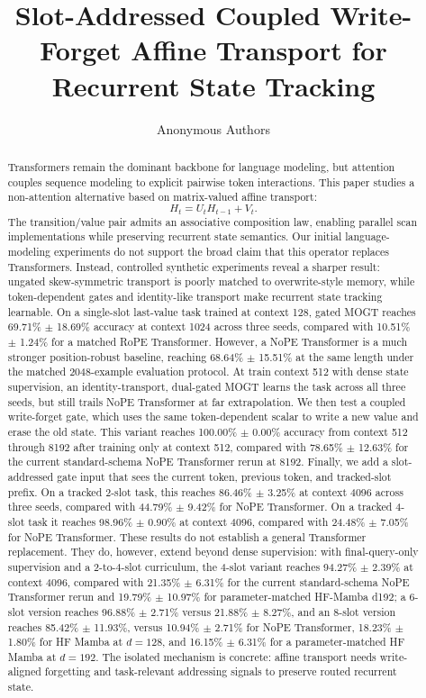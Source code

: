 \documentclass[10pt]{article}
\title{Slot-Addressed Coupled Write-Forget Affine Transport for Recurrent State Tracking}
\author{Anonymous Authors}
\date{}
\newcommand{\mogt}{MOGT}
\begin{document}
\maketitle

\begin{abstract}
Transformers remain the dominant backbone for language modeling, but attention
couples sequence modeling to explicit pairwise token interactions. This paper
studies a non-attention alternative based on matrix-valued affine transport:
\[
    H_t = U_t H_{t-1} + V_t.
\]
The transition/value pair admits an associative composition law, enabling
parallel scan implementations while preserving recurrent state semantics. Our
initial language-modeling experiments do not support the broad claim that this
operator replaces Transformers. Instead, controlled synthetic experiments reveal
a sharper result: ungated skew-symmetric transport is poorly matched to
overwrite-style memory, while token-dependent gates and identity-like transport
make recurrent state tracking learnable. On a single-slot last-value task
trained at context 128, gated \mogt{} reaches 69.71\% $\pm$ 18.69\% accuracy at
context 1024 across three seeds, compared with 10.51\% $\pm$ 1.24\% for a
matched RoPE Transformer. However, a NoPE Transformer is a much stronger
position-robust baseline, reaching 68.64\% $\pm$ 15.51\% at the same length
under the matched 2048-example evaluation protocol.
At train context 512 with dense state supervision, an identity-transport,
dual-gated \mogt{} learns the task across all three seeds, but still trails NoPE
Transformer at far extrapolation. We then test a coupled write-forget gate,
which uses the same token-dependent scalar to write a new value and erase the
old state. This variant reaches 100.00\% $\pm$ 0.00\% accuracy from context 512
through 8192 after training only at context 512, compared with 78.65\% $\pm$
12.63\% for the current standard-schema NoPE Transformer rerun at 8192.
Finally, we add a slot-addressed gate
input that sees the current token, previous token, and tracked-slot prefix. On
a tracked 2-slot task, this reaches 86.46\% $\pm$ 3.25\% at context 4096 across
three seeds, compared with 44.79\% $\pm$ 9.42\% for NoPE Transformer. On a
tracked 4-slot task it reaches 98.96\% $\pm$ 0.90\% at context 4096, compared
with 24.48\% $\pm$ 7.05\% for NoPE Transformer. These results do not establish
a general Transformer replacement. They do, however, extend beyond dense
supervision: with final-query-only supervision and a 2-to-4-slot curriculum,
the 4-slot variant reaches 94.27\% $\pm$ 2.39\% at context 4096, compared with
21.35\% $\pm$ 6.31\% for the current standard-schema NoPE Transformer rerun
and 19.79\% $\pm$ 10.97\% for parameter-matched HF-Mamba d192; a 6-slot
version reaches 96.88\% $\pm$ 2.71\% versus 21.88\% $\pm$ 8.27\%, and an
8-slot version
reaches 85.42\% $\pm$ 11.93\%, versus 10.94\% $\pm$ 2.71\% for NoPE
Transformer, 18.23\% $\pm$ 1.80\% for HF Mamba at $d=128$, and 16.15\% $\pm$
6.31\% for a parameter-matched HF Mamba at $d=192$. The isolated mechanism is
concrete: affine transport needs write-aligned forgetting and task-relevant
addressing signals to preserve routed recurrent state.
\end{abstract}
\end{document}
